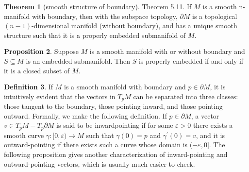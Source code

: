 \documentclass[12pt,a4paper]{book}
\theoremstyle{definition}
\newtheorem{defn}{Definition}[section]
\newtheorem{theo}[defn]{Theorem}
\newtheorem{prop}[defn]{Proposition}
\begin{document}
\begin{theo}[smooth structure of boundary]
    Theorem 5.11. If $M$ is a smooth n-manifold with boundary,
    then with the subspace topology, $\partial M$ is a topological $(n-1)$-dimensional manifold (without boundary), and has a unique smooth structure such that it is a properly embedded submanifold of $M$.
\end{theo}
\begin{prop}
    Suppose $M$ is a smooth manifold with or without boundary and $S \subseteq M$ is an embedded submanifold. Then $S$ is properly embedded if and only if it is a closed subset of $M$.
\end{prop}
\begin{defn}
    If $M$ is a smooth manifold with boundary and
    $p \in \partial M$, it is intuitively evident that
    the vectors in $T_p M$ can be separated into three classes: those tangent to the boundary, those pointing inward, and those pointing outward. Formally, we make the following definition. If $p \in \partial M$, a vector $v \in T_p M-T_p \partial M$ is said to be inwardpointing if for some $\varepsilon>0$ there exists a smooth curve $\gamma:[0, \varepsilon) \rightarrow M$ such that $\gamma(0)=p$ and $\gamma^{\prime}(0)=v$, and it is outward-pointing if there exists such a curve whose domain is $(-\varepsilon, 0]$.
    The following proposition gives another characterization of inward-pointing and outward-pointing vectors, which is usually much easier to check.
\end{defn}
\end{document}

